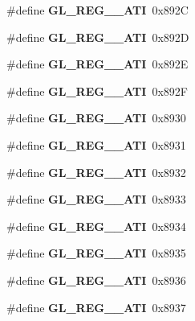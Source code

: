 \begin{DoxyCompactItemize}
\item 
\#define {\bfseries G\+L\+\_\+\+R\+E\+G\+\_\+\_\+\+A\+T\+I}~0x892\+C\label{_s_d_l__opengl_8h_aad3d78d3bbeb27b36eae386ddd0d52ee}

\item 
\#define {\bfseries G\+L\+\_\+\+R\+E\+G\+\_\+\_\+\+A\+T\+I}~0x892\+D\label{_s_d_l__opengl_8h_a01612ea7eb8cb747587c13397b9b6f3c}

\item 
\#define {\bfseries G\+L\+\_\+\+R\+E\+G\+\_\+\_\+\+A\+T\+I}~0x892\+E\label{_s_d_l__opengl_8h_ae35fa5a4094f1c82dce6fc352033a436}

\item 
\#define {\bfseries G\+L\+\_\+\+R\+E\+G\+\_\+\_\+\+A\+T\+I}~0x892\+F\label{_s_d_l__opengl_8h_ac6542b74df9851e8661f22159dc0517f}

\item 
\#define {\bfseries G\+L\+\_\+\+R\+E\+G\+\_\+\_\+\+A\+T\+I}~0x8930\label{_s_d_l__opengl_8h_add3ff7a479e2364fd305df285a5fb8e8}

\item 
\#define {\bfseries G\+L\+\_\+\+R\+E\+G\+\_\+\_\+\+A\+T\+I}~0x8931\label{_s_d_l__opengl_8h_a8a459e2556c46c002b309d791a5939bf}

\item 
\#define {\bfseries G\+L\+\_\+\+R\+E\+G\+\_\+\_\+\+A\+T\+I}~0x8932\label{_s_d_l__opengl_8h_af10d88dcc0e0490b03f5b426981944e2}

\item 
\#define {\bfseries G\+L\+\_\+\+R\+E\+G\+\_\+\_\+\+A\+T\+I}~0x8933\label{_s_d_l__opengl_8h_a6634fb7a0c9f68c4713f917f9a73ce3a}

\item 
\#define {\bfseries G\+L\+\_\+\+R\+E\+G\+\_\+\_\+\+A\+T\+I}~0x8934\label{_s_d_l__opengl_8h_a7e938dc1b7763fb8604fb63472b477f8}

\item 
\#define {\bfseries G\+L\+\_\+\+R\+E\+G\+\_\+\_\+\+A\+T\+I}~0x8935\label{_s_d_l__opengl_8h_a16eb5eaddc4c27855fa3541350072f68}

\item 
\#define {\bfseries G\+L\+\_\+\+R\+E\+G\+\_\+\_\+\+A\+T\+I}~0x8936\label{_s_d_l__opengl_8h_a821432c444b4fcbb9f52a64bd8a75b55}

\item 
\#define {\bfseries G\+L\+\_\+\+R\+E\+G\+\_\+\_\+\+A\+T\+I}~0x8937\label{_s_d_l__opengl_8h_a10b91364edfd1e60b4ddb72763ff94a6}


\end{DoxyCompactItemize}

